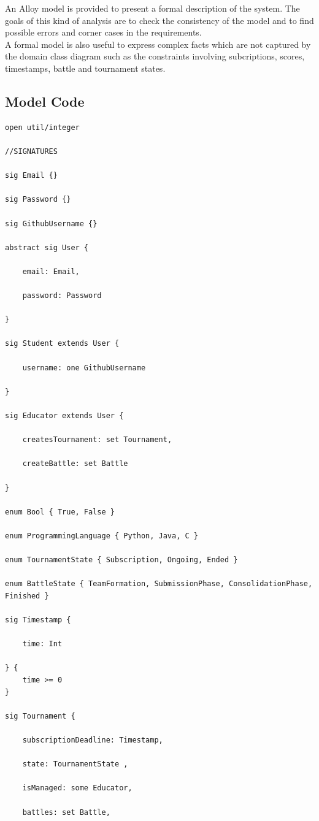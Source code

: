 An Alloy model is provided to present a formal description of the system. 
The goals of this kind of analysis are to check the consistency of the model and to find possible errors and corner cases in the requirements.\\
A formal model is also useful to express complex facts which are not captured by the domain class diagram such as the constraints involving subcriptions, scores, timestamps, battle and tournament states.\\

\subsection{Model Code}
\begin{lstlisting}[language=alloy]
open util/integer

//SIGNATURES

sig Email {}

sig Password {}

sig GithubUsername {}

abstract sig User {

    email: Email,

    password: Password

}

sig Student extends User {

    username: one GithubUsername

}

sig Educator extends User {

    createsTournament: set Tournament,

    createBattle: set Battle

}

enum Bool { True, False }

enum ProgrammingLanguage { Python, Java, C }

enum TournamentState { Subscription, Ongoing, Ended }

enum BattleState { TeamFormation, SubmissionPhase, ConsolidationPhase, Finished }

sig Timestamp {

    time: Int

} { 
    time >= 0 
}

sig Tournament {

    subscriptionDeadline: Timestamp,

    state: TournamentState ,

    isManaged: some Educator,

    battles: set Battle,


\end{lstlisting}
